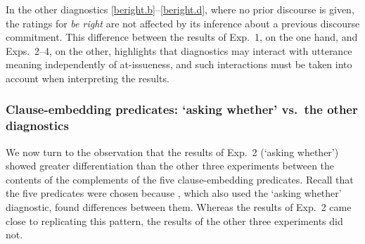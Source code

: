 \documentclass[times,linguex]{glossa}
\begin{document}
%
In the other diagnostics \ref{beright.b}--\ref{beright.d}, where no prior discourse is given, the ratings for \emph{be right} are not affected by its inference about a previous discourse commitment. This difference between the results of Exp.~1, on the one hand, and Exps.~2--4, on the other, highlights that diagnostics may interact with utterance meaning independently of at-issueness, and such interactions must be taken into account when interpreting the results.


\subsubsection{Clause-embedding predicates: `asking whether'  vs.~the other diagnostics\label{ssub:differentiation}}

We now turn to the observation that the results of Exp.~2 (`asking whether') showed greater differentiation than the other three experiments between the contents of the complements of the five clause-embedding predicates. Recall that the five predicates were chosen because \citealt[Exp.~1]{degen_projection_2025}, which also used the `asking whether' diagnostic, found differences between them. %
Whereas the results of Exp.~2 came close to replicating this pattern, the results of the other three experiments did not.

\end{document}
